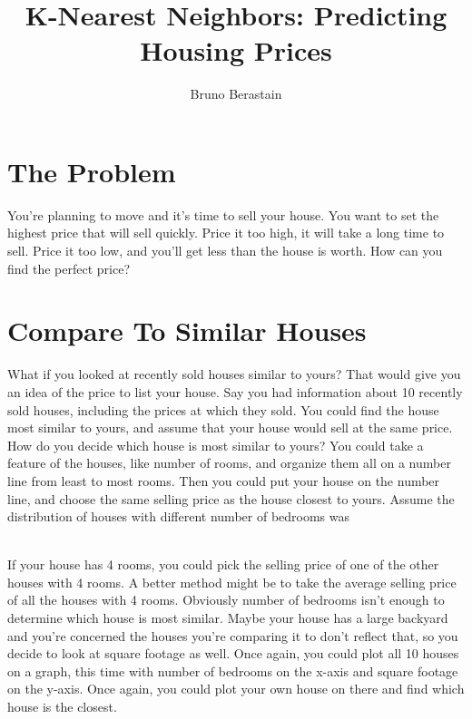 \documentclass{article}
\author{Bruno Berastain}
\begin{document}
\title{K-Nearest Neighbors: Predicting Housing Prices}
\maketitle

\section{The Problem}
You're planning to move and it's time to sell your house. You want to set the highest price that will sell quickly. Price it too high, it will take a long time to sell. Price it too low, and you'll get less than the house is worth. How can you find the perfect price?

\section{Compare To Similar Houses}
What if you looked at recently sold houses similar to yours? That would give you an idea of the price to list your house. Say you had information about 10 recently sold houses, including the prices at which they sold. You could find the house most similar to yours, and assume that your house would sell at the same price. How do you decide which house is most similar to yours? You could take a feature of the houses, like number of rooms, and organize them all on a number line from least to most rooms. Then you could put your house on the number line, and choose the same selling price as the house closest to yours. Assume the distribution of houses with different number of bedrooms was\\

\\

If your house has 4 rooms, you could pick the selling price of one of the other houses with 4 rooms. A better method might be to take the average selling price of all the houses with 4 rooms. Obviously number of bedrooms isn't enough to determine which house is most similar. Maybe your house has a large backyard and you're concerned the houses you're comparing it to don't reflect that, so you decide to look at square footage as well. Once again, you could plot all 10 houses on a graph, this time with number of bedrooms on the x-axis and square footage on the y-axis. Once again, you could plot your own house on there and find which house is the closest.
\end{document}
